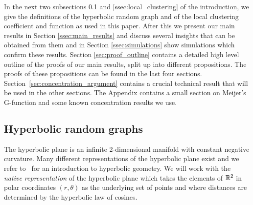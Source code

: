In the next two subsections \ref{ssec:hyperbolic_model} and \ref{ssec:local_clustering} of the introduction, we give the definitions of the hyperbolic random graph and of the local clustering coefficient and function as used in this paper. After this we present our main results in Section \ref{ssec:main_results} and discuss several insights that can be obtained from them and in Section \ref{ssec:simulations} show simulations which confirm these results. Section \ref{sec:proof_outline} contains a detailed high level outline of the proofs of our main results, split up into different propositions. The proofs of these propositions can be found in the last four sections. Section~\ref{sec:concentration_argument} contains a crucial technical result that will be used in the other sections. The Appendix contains a small section on Meijer's G-function and some known concentration results we use.

\subsection{Hyperbolic random graphs}\label{ssec:hyperbolic_model}

The hyperbolic plane is an infinite $2$-dimensional manifold with constant negative curvature. Many different representations of the hyperbolic plane exist and we refer to~\cite{anderson2006hyperbolic} \cite{katok1992fuchsian} \cite{beardon2012geometry} for an introduction to hyperbolic geometry.  We will work with the \emph{native representation} of the hyperbolic plane which takes the elements of ${\mathbb R}^2$ in polar coordinates $(r,\theta)$ as the underlying set of points and where distances are determined by the hyperbolic law of cosines.

